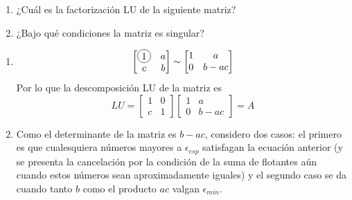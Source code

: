 \documentclass[paper=letter, fontsize=11pt]{scrartcl}
\numberwithin{equation}{section} %
\numberwithin{figure}{section} %
\numberwithin{table}{section} %
\newcommand\Circle[1]{%
  \tikz[baseline=(char.base)]\node[circle,draw,inner sep=2pt] (char) {#1};}
\newenvironment{cframed}[1][blue]
  {\begin{tcolorbox}[colframe=#1,colback=white]}
  {\end{tcolorbox}}
\begin{document}
\begin{enumerate}
\begin{enumerate}
\end{enumerate}

\begin{cframed}[purple]
\item 
\begin{enumerate}
\item ¿Cuál es la factorización LU de la siguiente matriz?
\item ¿Bajo qué condiciones la matriz es singular?
\end{enumerate}
\end{cframed}
\begin{enumerate}
\item \[
 \begin{bmatrix}
\Circle{1} & a \\
c & b
\end{bmatrix}  \sim  \begin{bmatrix}
				1 & a   \\
				 0 & b-ac
				\end{bmatrix} 
\]
Por lo que la descomposición LU de la matriz es
\[
LU =  \begin{bmatrix}
1 & 0 \\
c & 1
\end{bmatrix}   \begin{bmatrix}
				1 & a   \\
				 0 & b-ac
				\end{bmatrix} =A 
\]

\item Como el determinante de la matriz es $b-ac$, considero dos casos: el primero es que cualesquiera números mayores a $\epsilon_{esp}$ satisfagan la ecuación anterior (y se presenta la cancelación por la condición de la suma de flotantes aún cuando estos números sean aproximadamente iguales) y el segundo caso se da cuando tanto $b$ como el producto $ac$ valgan $\epsilon_{min}$.
\end{enumerate}


\end{enumerate}
\end{document}
